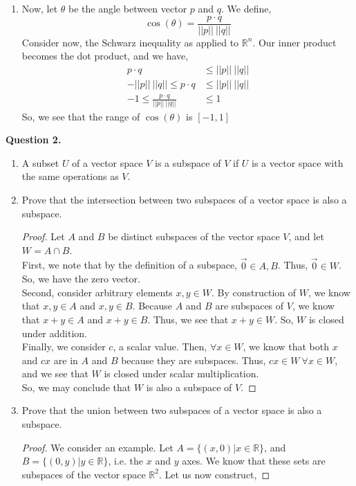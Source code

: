 \documentclass[letterpaper,10pt]{article}
\newcommand{\R}{\mathbb{R}}
\begin{document}
\begin{description}
\begin{enumerate}[label=\alph*.]
\begin{proof}
\[||p-q||\geq\big|||p||-||q||\big|\geq ||p||-||q||\]
As desired.
\end{proof}
\item Now, let $\theta$ be the angle between vector $p$ and $q$. We define,
\[\cos(\theta)=\frac{p\cdot q}{||p||\ ||q||}\]
Consider now, the Schwarz inequality as applied to $\R^n$. Our inner product becomes the dot product, and we have,
\begin{align*}
p\cdot q &\leq||p||\ ||q||\\
-||p||\ ||q||\leq  p\cdot q &\leq||p||\ ||q||\\
-1\leq \frac{p\cdot q}{||p||\ ||q||}&\leq1
\end{align*}
So, we see that the range of $\cos(\theta)$ is $[-1,1]$
\end{enumerate}
\item \textbf{Question 2.}
\begin{enumerate}[label=\alph*.]
\item A subset $U$ of a vector space $V$ is a subspace of $V$ if $U$ is a vector space with the same operations as $V$.
\item Prove that the intersection between two subspaces of a vector space is also a subspace.
\begin{proof}
Let $A$ and $B$ be distinct subspaces of the vector space $V$, and let $W=A\cap B$.\\
First, we note that by the definition of a subspace, $\vec{0}\in A,B$. Thus, $\vec{0}\in W$. So, we have the zero vector.\\
Second, consider arbitrary elements $x,y\in W$. By construction of $W$, we know that $x,y\in A$ and $x,y\in B$. Because $A$ and $B$ are subspaces of $V$, we know that $x+y\in A$ and $x+y\in B$. Thus, we see that $x+y\in W$. So, $W$ is closed under addition.\\
Finally, we consider $c$, a scalar value. Then, $\forall x\in W$, we know that both $x$ and $cx$ are in $A$ and $B$ because they are subspaces. Thus, $cx\in W\ \forall x\in W$, and we see that $W$ is closed under scalar multiplication.\\
So, we may conclude that $W$ is also a subspace of $V$.
\end{proof}
\item Prove that the union between two subspaces of a vector space is also a subspace.\\
\begin{proof}
We consider an example. Let $A=\{(x,0)|x\in \R\}$, and $B=\{(0,y)|y\in \R\}$, i.e. the $x$ and $y$ axes. We know that these sets are subspaces of the vector space $\R^2$. Let us now construct,

\end{proof}
\end{enumerate}
\end{description}
\end{document}
